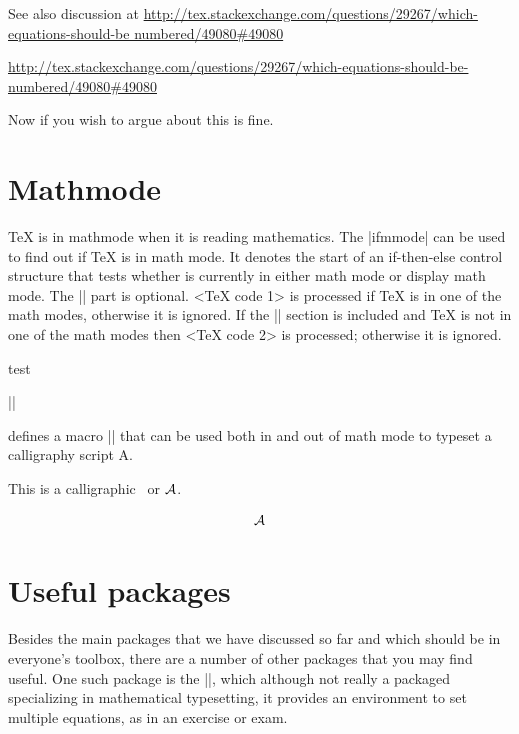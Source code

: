 {See also discussion at \url{http://tex.stackexchange.com/questions/29267/which-equations-should-be numbered/49080\#49080}

\url{http://tex.stackexchange.com/questions/29267/which-equations-should-be-numbered/49080#49080}

Now if you wish to argue about this is fine.

\section{Mathmode}

TeX is in mathmode when it is reading mathematics. The |ifmmode| can be used to find out if TeX is in math mode. It denotes the start of an if-then-else control structure that tests whether \tex is currently in either math mode or display math mode. The |\else| part is optional. <TeX code 1> is processed if TeX is in one of the math modes, otherwise it is ignored. If the |\else| section is included and TeX is not in one of the math modes then <TeX code 2> is processed; otherwise it is ignored.


\begin{tcblisting}{}
 \def\a{test}
\a
\end{tcblisting}
\medskip
\begin{tcolorbox}[colback=blue!5,boxrule=2pt,boxsep=3mm,colframe=blue!75!black,title=Basic Definitions,width=0.65\textwidth]
    |\def\A{\ifmmode \mathcal{A} \else \[\mathcal{A}\] \fi}|
\end{tcolorbox}
\medskip


defines a macro |\A| that can be used both in and out of math mode to typeset a calligraphy script A. 

This is a calligraphic \A\ or $\A$.


\[ \A \]


\clearpage
\section{Useful packages}
Besides the main packages that we have discussed so far and which should be in everyone's toolbox, there are a number of other packages that you may find useful. One such package is the |\multienum|, which although not really a packaged specializing in mathematical typesetting, it provides an environment to set multiple equations, as in an exercise or exam.

}
